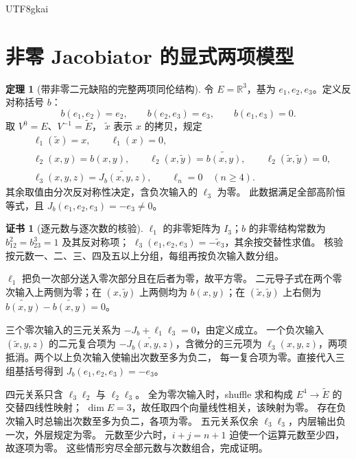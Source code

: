 \documentclass[12pt]{report}
\makeatletter
\theoremstyle{definition}
\newtheorem{theorem}{定理}[chapter]
\newtheorem{Certificate}{证书}[chapter]
\renewenvironment{proof}[1][\proofname]{\par
  \pushQED{\qed}\normalfont
  \topsep6\p@\@plus6\p@\relax
  \trivlist
  \item[\hskip\labelsep\normalfont #1\@addpunct{.}]\ignorespaces
}{
  \popQED\endtrivlist\@endpefalse
}
\newcommand{\RR}{\mathbb R}
\makeatother
\begin{document}
\begin{CJK*}{UTF8}{gkai}
\section{非零 Jacobiator 的显式两项模型}
\begin{theorem}[带非零二元缺陷的完整两项同伦结构]
\label{thm:nonzero-lie-two}
令 \(E=\RR^3\)，基为 \(e_1,e_2,e_3\)。定义反对称括号 \(b\)：
\[
b(e_1,e_2)=e_2,\qquad b(e_2,e_3)=e_3,\qquad b(e_1,e_3)=0.
\]
取 \(V^0=E\)、\(V^{-1}=\widetilde E\)，
\(\widetilde x\) 表示 \(x\) 的拷贝，规定
\[
\begin{aligned}
&\ell_1(\widetilde x)=x,\qquad \ell_1(x)=0,\\
&\ell_2(x,y)=b(x,y),\qquad
 \ell_2(x,\widetilde y)=\widetilde{b(x,y)},\qquad
 \ell_2(\widetilde x,\widetilde y)=0,\\
&\ell_3(x,y,z)=\widetilde{J_b(x,y,z)},\qquad \ell_n=0\quad(n\ge4).
\end{aligned}
\]
其余取值由分次反对称性决定，含负次输入的 \(\ell_3\) 为零。
此数据满足全部高阶恒等式，且 \(J_b(e_1,e_2,e_3)=-e_3\ne0\)。
\end{theorem}
\begin{Certificate}[逐元数与逐次数的核验]
\(\ell_1\) 的非零矩阵为 \(I_3\)；\(b\) 的非零结构常数为
\(b_{12}^{2}=b_{23}^{3}=1\) 及其反对称项；
\(\ell_3(e_1,e_2,e_3)=-\widetilde e_3\)，其余按交替性求值。
核验按元数一、二、三、四及五以上分组，每组再按负次输入数分组。
\end{Certificate}
\begin{proof}
\(\ell_1\) 把负一次部分送入零次部分且在后者为零，故平方零。
二元导子式在两个零次输入上两侧为零；在 \((x,\widetilde y)\) 上两侧均为
\(b(x,y)\)；在 \((\widetilde x,\widetilde y)\) 上右侧为
\(\widetilde{b(x,y)}-\widetilde{b(x,y)}=0\)。

三个零次输入的三元关系为 \(-J_b+\ell_1\ell_3=0\)，由定义成立。
一个负次输入 \((\widetilde x,y,z)\) 的二元复合项为
\(-\widetilde{J_b(x,y,z)}\)，含微分的三元项为
\(\ell_3(x,y,z)\)，两项抵消。两个以上负次输入使输出次数至多为负二，
每一复合项为零。直接代入三组基括号得到 \(J_b(e_1,e_2,e_3)=-e_3\)。

四元关系只含 \(\ell_3\ell_2\) 与 \(\ell_2\ell_3\)。
全为零次输入时，shuffle 求和构成 \(E^4\to\widetilde E\) 的交替四线性映射；
\(\dim E=3\)，故任取四个向量线性相关，该映射为零。
存在负次输入时总输出次数至多为负二，各项为零。
五元关系仅余 \(\ell_3\ell_3\)，内层输出负一次，外层规定为零。
元数至少六时，\(i+j=n+1\) 迫使一个运算元数至少四，故逐项为零。
这些情形穷尽全部元数与次数组合，完成证明。
\end{proof}


\end{CJK*}
\end{document}
